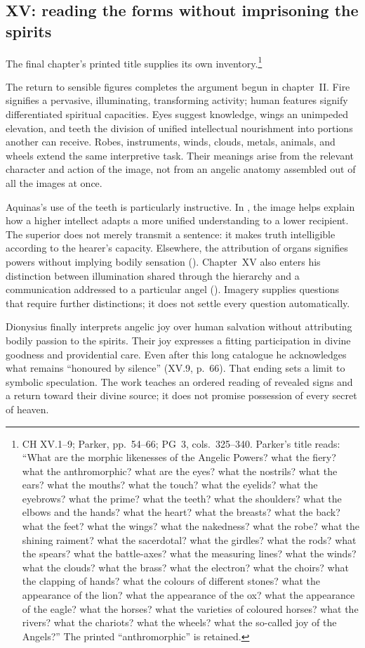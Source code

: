 \subsection{XV: reading the forms without imprisoning the spirits}
The final chapter's printed title supplies its own inventory.\footnote{CH XV.1--9; Parker, pp.~54--66; PG~3, cols.~325--340. Parker's title reads: ``What are the morphic likenesses of the Angelic Powers? what the fiery? what the anthromorphic? what are the eyes? what the nostrils? what the ears? what the mouths? what the touch? what the eyelids? what the eyebrows? what the prime? what the teeth? what the shoulders? what the elbows and the hands? what the heart? what the breasts? what the back? what the feet? what the wings? what the nakedness? what the robe? what the shining raiment? what the sacerdotal? what the girdles? what the rods? what the spears? what the battle-axes? what the measuring lines? what the winds? what the clouds? what the brass? what the electron? what the choirs? what the clapping of hands? what the colours of different stones? what the appearance of the lion? what the appearance of the ox? what the appearance of the eagle? what the horses? what the varieties of coloured horses? what the rivers? what the chariots? what the wheels? what the so-called joy of the Angels?'' The printed ``anthromorphic'' is retained.}

The return to sensible figures completes the argument begun in chapter~II. Fire signifies a pervasive, illuminating, transforming activity; human features signify differentiated spiritual capacities. Eyes suggest knowledge, wings an unimpeded elevation, and teeth the division of unified intellectual nourishment into portions another can receive. Robes, instruments, winds, clouds, metals, animals, and wheels extend the same interpretive task. Their meanings arise from the relevant character and action of the image, not from an angelic anatomy assembled out of all the images at once.

Aquinas's use of the teeth is particularly instructive. In , the image helps explain how a higher intellect adapts a more unified understanding to a lower recipient. The superior does not merely transmit a sentence: it makes truth intelligible according to the hearer's capacity. Elsewhere, the attribution of organs signifies powers without implying bodily sensation (). Chapter~XV also enters his distinction between illumination shared through the hierarchy and a communication addressed to a particular angel (). Imagery supplies questions that require further distinctions; it does not settle every question automatically.

Dionysius finally interprets angelic joy over human salvation without attributing bodily passion to the spirits. Their joy expresses a fitting participation in divine goodness and providential care. Even after this long catalogue he acknowledges what remains ``honoured by silence'' (XV.9, p.~66). That ending sets a limit to symbolic speculation. The work teaches an ordered reading of revealed signs and a return toward their divine source; it does not promise possession of every secret of heaven.
